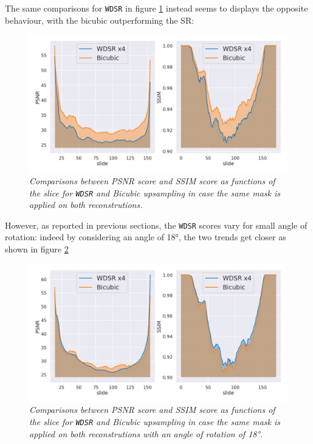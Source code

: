 \documentclass[12pt,a4paper]{report}
\begin{document}
The same comparisons for {\tt WDSR} in figure \ref{fig:wdsr-bet-same-mask} instead seems to displays the opposite behaviour, with the bicubic outperforming the SR:

\begin{figure}[H]
 \centering
 \includegraphics[scale=0.35]{./images/betted_x4_slide_same_mask.png}
 \caption{\it Comparisons between PSNR score and SSIM score as functions of the slice for {\tt WDSR} and Bicubic upsampling in case the same mask is applied on both reconstrutions.}
 \label{fig:wdsr-bet-same-mask}
\end{figure}

However, as reported in previous sections, the {\tt WDSR} scores vary for small angle of rotation: indeed by considering an angle of 18°, the two trends get closer as shown in figure \ref{fig:wdsr-betted-angle-18}

\begin{figure}[H]
 \includegraphics[scale=0.35]{./images/betted_x4_slide_same_mask_angle.png}
 \caption{\it Comparisons between PSNR score and SSIM score as functions of the slice for {\tt WDSR} and Bicubic upsampling in case the same mask is applied on both reconstrutions with an angle of rotation of 18°.}
 \label{fig:wdsr-betted-angle-18}
\end{figure}
\end{document}
